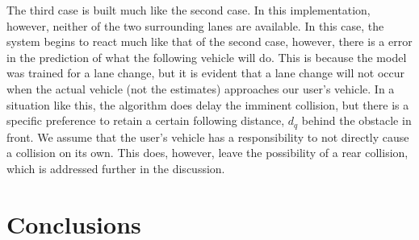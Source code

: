 \documentclass[letterpaper, 10 pt, conference]{ieeeconf}  %
\begin{document}
The third case is built much like the second case. In this implementation, however, neither of the two surrounding lanes are available. In this case, the system begins to react much like that of the second case, however, there is a error in the prediction of what the following vehicle will do. This is because the model was trained for a lane change, but it is evident that a lane change will not occur when the actual vehicle (not the estimates) approaches our user's vehicle. In a situation like this, the algorithm does delay the imminent collision, but there is a specific preference to retain a certain following distance, $d_q$ behind the obstacle in front. We assume that the user's vehicle has a responsibility to not directly cause a collision on its own. This does, however, leave the possibility of a rear collision, which is addressed further in the discussion.


\section{Conclusions} \label{sec:concs}

\newpage

%
%
%


  
  





\end{document}
